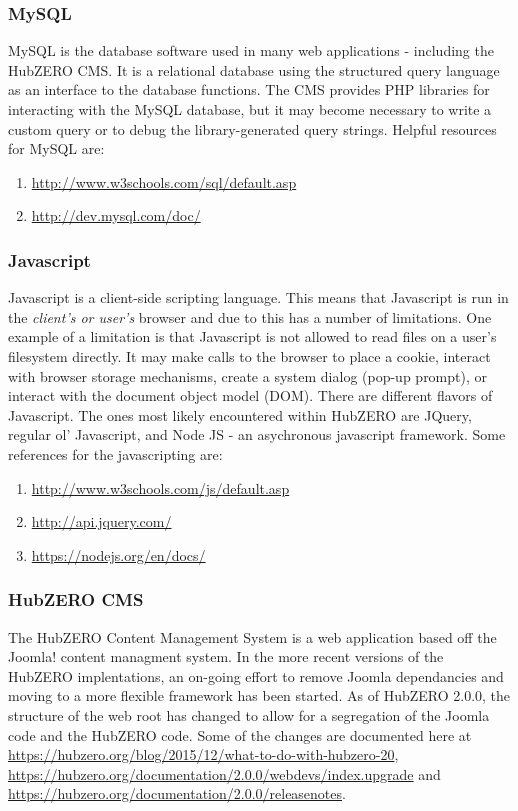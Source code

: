 \documentclass[10pt,letterpaper,titlepage]{article}
\begin{document}
\subsubsection{MySQL}
MySQL is the database software used in many web applications - including the HubZERO CMS. It is a relational database using the structured query language as an interface to the database functions.
The CMS provides PHP libraries for interacting with the MySQL database, but it may become necessary to write a custom query or to debug the library-generated query strings. Helpful resources for MySQL are:

\begin{enumerate}
\item \url{http://www.w3schools.com/sql/default.asp}
\item \url{http://dev.mysql.com/doc/}
\end{enumerate}

\subsubsection{Javascript}
Javascript is a client-side scripting language. This means that Javascript is run in the \emph{client's or user's} browser and due to this has a number of limitations. One example of a limitation is that Javascript is not allowed
to read files on a user's filesystem directly. It may make calls to the browser to place a cookie, interact with browser storage mechanisms, create a system dialog (pop-up prompt), or interact with the document object model (DOM). 
There are different flavors of Javascript. The ones most likely encountered within HubZERO are JQuery, regular ol' Javascript, and Node JS - an asychronous javascript framework. Some references for the javascripting are:

\begin{enumerate}
\item \url{http://www.w3schools.com/js/default.asp}
\item \url{http://api.jquery.com/}
\item \url{https://nodejs.org/en/docs/}
\end{enumerate}

\subsubsection{HubZERO CMS}
The HubZERO Content Management System is a web application based off the Joomla! content managment system. In the more recent versions of the HubZERO implentations, an on-going effort to remove Joomla dependancies and moving
to a more flexible framework has been started. As of HubZERO 2.0.0, the structure of the web root has changed to allow for a segregation of the Joomla code and the HubZERO code. Some of the changes are documented
here at \url{https://hubzero.org/blog/2015/12/what-to-do-with-hubzero-20}, \url{https://hubzero.org/documentation/2.0.0/webdevs/index.upgrade} and \url{https://hubzero.org/documentation/2.0.0/releasenotes}. 
\end{document}
